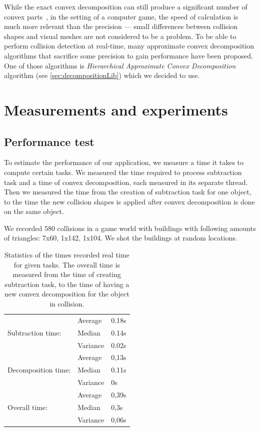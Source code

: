 While the exact convex decomposition can still produce a significant number of convex parts~\cite{convexDecomp}, in the setting of a computer game, the speed of calculation is much more relevant than the precision --- small differences between collision shapes and visual meshes are not considered to be a problem. To be able to perform collision detection at real-time, many approximate convex decomposition algorithms that sacrifice some precision to gain performance have been proposed. One of those algorithms is \emph{Hierarchical Approximate Convex Decomposition} algorithm (see \cref{sec:decompositionLib}) which we decided to use.

\section{Measurements and experiments}
\label{sec:testing}

\subsection{Performance test}
To estimate the performance of our application, we measure a time it takes to compute certain tasks. We measured the time required to process subtraction task and a time of convex decomposition, each measured in its separate thread. Then we measured the time from the creation of subtraction task for one object, to the time the new collision shapes is applied after convex decomposition is done on the same object.

We recorded 580 collisions in a game world with buildings with following amounts of triangles: 7x60, 1x142, 1x104. We shot the buildings at random locations.

\begin{table}
	\centering
  \begin{tabular}{lll}
  & Average & 0.18s \\
  Subtraction time: & Median & 0.14s \\
  & Variance & 0.02s \\
  \hline
  & Average & 0,13s \\
  Decomposition time: & Median & 0.11s \\
  & Variance & 0s \\
  \hline
  & Average & 0,39s \\
  Overall time:& Median & 0,3s \\
  & Variance & 0,06s \\
  \end{tabular}
  \caption{Statistics of the times recorded real time for given tasks. The overall time is measured from the time of creating subtraction task, to the time of having a new convex decomposition for the object in collision.}
  \label{tab:performace}
\end{table}

